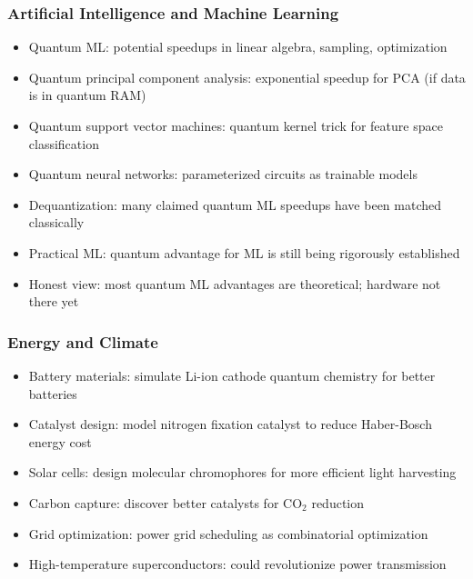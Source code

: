 \begin{frame}[fragile]\frametitle{Artificial Intelligence and Machine Learning}
\begin{itemize}
\item Quantum ML: potential speedups in linear algebra, sampling, optimization
\item Quantum principal component analysis: exponential speedup for PCA (if data is in quantum RAM)
\item Quantum support vector machines: quantum kernel trick for feature space classification
\item Quantum neural networks: parameterized circuits as trainable models
\item Dequantization: many claimed quantum ML speedups have been matched classically
\item Practical ML: quantum advantage for ML is still being rigorously established
\item Honest view: most quantum ML advantages are theoretical; hardware not there yet
\end{itemize}
\end{frame}

\begin{frame}[fragile]\frametitle{Energy and Climate}
\begin{itemize}
\item Battery materials: simulate Li-ion cathode quantum chemistry for better batteries
\item Catalyst design: model nitrogen fixation catalyst to reduce Haber-Bosch energy cost
\item Solar cells: design molecular chromophores for more efficient light harvesting
\item Carbon capture: discover better catalysts for CO$_2$ reduction
\item Grid optimization: power grid scheduling as combinatorial optimization
\item High-temperature superconductors: could revolutionize power transmission
\end{itemize}
\end{frame}

